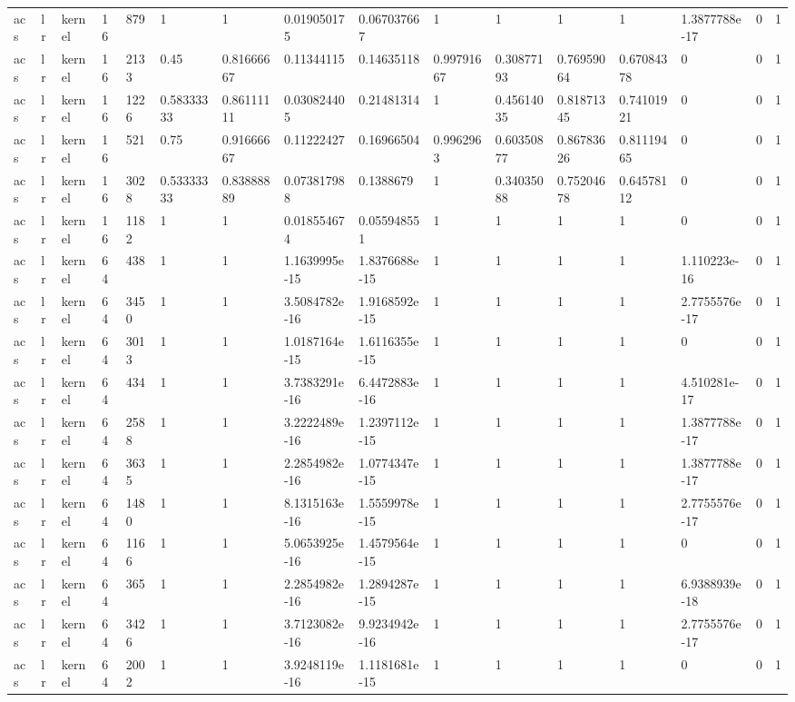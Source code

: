 \begin{tabular}{llllllllllllllll}
acs & lr & kernel & 16 & 879 & 1 & 1 & 0.019050175 & 0.067037667 & 1 & 1 & 1 & 1 & 1.3877788e-17 & 0 & 1 \\
acs & lr & kernel & 16 & 2133 & 0.45 & 0.81666667 & 0.11344115 & 0.14635118 & 0.99791667 & 0.30877193 & 0.76959064 & 0.67084378 & 0 & 0 & 1 \\
acs & lr & kernel & 16 & 1226 & 0.58333333 & 0.86111111 & 0.030824405 & 0.21481314 & 1 & 0.45614035 & 0.81871345 & 0.74101921 & 0 & 0 & 1 \\
acs & lr & kernel & 16 & 521 & 0.75 & 0.91666667 & 0.11222427 & 0.16966504 & 0.9962963 & 0.60350877 & 0.86783626 & 0.81119465 & 0 & 0 & 1 \\
acs & lr & kernel & 16 & 3028 & 0.53333333 & 0.83888889 & 0.073817988 & 0.1388679 & 1 & 0.34035088 & 0.75204678 & 0.64578112 & 0 & 0 & 1 \\
acs & lr & kernel & 16 & 1182 & 1 & 1 & 0.018554674 & 0.055948551 & 1 & 1 & 1 & 1 & 0 & 0 & 1 \\
acs & lr & kernel & 64 & 438 & 1 & 1 & 1.1639995e-15 & 1.8376688e-15 & 1 & 1 & 1 & 1 & 1.110223e-16 & 0 & 1 \\
acs & lr & kernel & 64 & 3450 & 1 & 1 & 3.5084782e-16 & 1.9168592e-15 & 1 & 1 & 1 & 1 & 2.7755576e-17 & 0 & 1 \\
acs & lr & kernel & 64 & 3013 & 1 & 1 & 1.0187164e-15 & 1.6116355e-15 & 1 & 1 & 1 & 1 & 0 & 0 & 1 \\
acs & lr & kernel & 64 & 434 & 1 & 1 & 3.7383291e-16 & 6.4472883e-16 & 1 & 1 & 1 & 1 & 4.510281e-17 & 0 & 1 \\
acs & lr & kernel & 64 & 2588 & 1 & 1 & 3.2222489e-16 & 1.2397112e-15 & 1 & 1 & 1 & 1 & 1.3877788e-17 & 0 & 1 \\
acs & lr & kernel & 64 & 3635 & 1 & 1 & 2.2854982e-16 & 1.0774347e-15 & 1 & 1 & 1 & 1 & 1.3877788e-17 & 0 & 1 \\
acs & lr & kernel & 64 & 1480 & 1 & 1 & 8.1315163e-16 & 1.5559978e-15 & 1 & 1 & 1 & 1 & 2.7755576e-17 & 0 & 1 \\
acs & lr & kernel & 64 & 1166 & 1 & 1 & 5.0653925e-16 & 1.4579564e-15 & 1 & 1 & 1 & 1 & 0 & 0 & 1 \\
acs & lr & kernel & 64 & 365 & 1 & 1 & 2.2854982e-16 & 1.2894287e-15 & 1 & 1 & 1 & 1 & 6.9388939e-18 & 0 & 1 \\
acs & lr & kernel & 64 & 3426 & 1 & 1 & 3.7123082e-16 & 9.9234942e-16 & 1 & 1 & 1 & 1 & 2.7755576e-17 & 0 & 1 \\
acs & lr & kernel & 64 & 2002 & 1 & 1 & 3.9248119e-16 & 1.1181681e-15 & 1 & 1 & 1 & 1 & 0 & 0 & 1 \\

\end{tabular}
